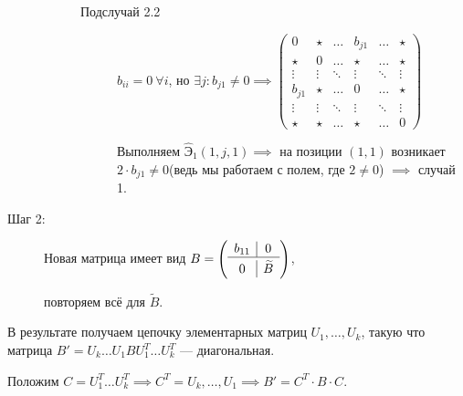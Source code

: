 \begin{description}
\begin{description}
\begin{description}
            \item[Подслучай 2.2]  
            $b_{i i} = 0 \ \forall i$, но $\exists j \colon b_{j 1} \neq 0 \implies
            \left(
                \begin{array}{c|ccccc}
                    0 & \star & \dots & b_{j 1} & \dots & \star \\
                    \hline
                    \star & 0 & \dots & \star & \dots & \star \\
                    \vdots & \vdots & \ddots & \vdots & \ddots & \vdots \\
                    b_{j 1} & \star & \dots & 0 & \dots & \star \\
                    \vdots & \vdots & \ddots & \vdots & \ddots & \vdots \\
                    \star & \star & \dots & \star & \dots & 0
                \end{array}
            \right)
            $

            Выполняем $\widehat{\text{Э}}_{1} (1, j, 1) \implies$ на позиции $(1,1)$ возникает $2 \cdot b_{j 1} \neq 0$(ведь мы работаем с полем, где $2 \neq 0$) $ \implies$ случай 1.
        \end{description}  
    \end{description}
    \item[Шаг 2:]
    Новая матрица имеет вид 
    $B = \left(
            \begin{array}{c|c}
                b_{1 1} & 0 \\
                \hline
                \noalign{\vskip 0.5ex}
                0 & \widetilde{B}
            \end{array} 
        \right)$,

    повторяем всё для $\widetilde{B}$.
\end{description}


В результате получаем цепочку элементарных матриц $U_{1}, \dots , U_{k}$, такую что матрица $B' = U_{k} \dots U_{1} B U^{T}_{1} \dots U^{T}_{k}$ --- диагональная.

Положим $C = U^{T}_{1} \dots U^{T}_{k} \implies C^{T} = U_{k}, \dots , U_{1} \implies B' = C^{T} \cdot B \cdot C $.

\begin{comment}
    Матрицу C можно вычислить модифицировав алгоритм. Припишем единичную матрицу E справа от B и будем выполнять с ней только элементарные преобразования строк.
    \begin{equation}
        (B \mid E) \leadsto (B' \mid P), P = U_{k} \dots U_{2} U_{1} = C^{T} \implies C = P^{T}
    \end{equation}
\end{comment}

